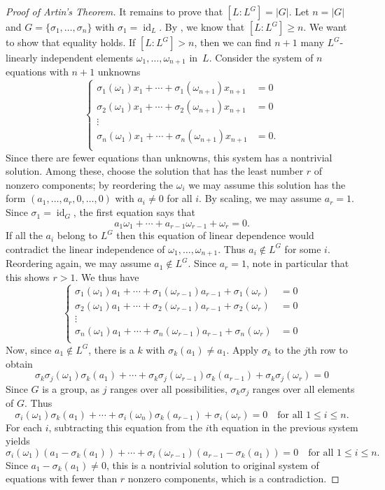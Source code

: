\documentclass[12pt]{amsart}
\theoremstyle{definition}
\numberwithin{equation}{theorem}
\def\id{\operatorname{id}}
\begin{document}
\begin{proof}[Proof of Artin's Theorem]
It remains to prove that $[L: L^G] = |G|$. Let $n = |G|$ and $G=\{\sigma_1, \ldots, \sigma_n\}$ with $\sigma_1 = \id_L$.
By , we know that $[L: L^G] \geqslant n$. We want to show that equality holds.
If $[L: L^G] > n$, then we can find $n+1$ many $L^G$-linearly independent elements $\omega_1, \ldots, \omega_{n+1}$ in~$L$. Consider the system of $n$ equations with $n+1$ unknowns
$$\left\lbrace\begin{array}{cl}
\sigma_1(\omega_1) x_1 + \cdots + \sigma_1(\omega_{n+1}) x_{n+1} & = 0 \\
\sigma_2(\omega_1) x_1 + \cdots + \sigma_2(\omega_{n+1}) x_{n+1} & = 0 \\
\vdots \\
\sigma_n(\omega_1) x_1 + \cdots + \sigma_n(\omega_{n+1}) x_{n+1} & = 0. \\
\end{array}\right.$$
Since there are fewer equations than unknowns, this system has a nontrivial solution. Among these, choose the solution that has the least number $r$ of nonzero components; by reordering the $\omega_i$ we may assume this solution has the form $(a_1, \ldots, a_r, 0, \ldots, 0)$ with $a_i \neq 0$ for all $i$. By scaling, we may assume $a_r = 1$. Since $\sigma_1 = \id_G$, the first equation says that
$$a_1 \omega_1 + \cdots + a_{r-1} \omega_{r-1} + \omega_r = 0.$$
If all the $a_i$ belong to $L^G$ then this equation of linear dependence would contradict the linear independence of $\omega_1, \ldots, \omega_{n+1}$. Thus $a_i \notin L^G$ for some $i$. Reordering again, we may assume $a_1 \notin L^G$.
Since $a_r =1$, note in particular that this shows $r > 1$.
We thus have
$$\left\lbrace\begin{array}{cl}
\sigma_1(\omega_1) a_1 + \cdots + \sigma_1(\omega_{r-1}) a_{r-1} + \sigma_1(\omega_r)  & = 0 \\
\sigma_2(\omega_1) a_1 + \cdots + \sigma_2(\omega_{r-1}) a_{r-1} + \sigma_2(\omega_r)  & = 0 \\
\vdots \\
\sigma_n(\omega_1) a_1 + \cdots + \sigma_n(\omega_{r-1}) a_{r-1} + \sigma_n(\omega_r)  & = 0 \\
\end{array}\right.$$
Now, since $a_1 \notin L^G$, there is a $k$ with $\sigma_k(a_1) \neq a_1$. Apply $\sigma_k$ to the $j$th row to obtain
$$
\sigma_k \sigma_j(\omega_1) \sigma_k(a_1) + \cdots + \sigma_k \sigma_j(\omega_{r-1})\sigma_k(a_{r-1})
+ \sigma_k \sigma_j(\omega_{r})  = 0
$$
Since $G$ is a group, as $j$ ranges over all possibilities, $\sigma_k \sigma_j$ ranges over all
elements of $G$. Thus
$$
\sigma_i(\omega_1) \sigma_k(a_1) + \cdots + \sigma_i(\omega_{n})\sigma_k(a_{r-1})
+ \sigma_i(\omega_{r})  = 0 \quad \textrm{for all } 1 \leqslant i \leqslant n.$$
For each $i$, subtracting this equation from the $i$th equation in the previous system yields
$$\sigma_i(\omega_1) (a_1 -  \sigma_k(a_1)) + \cdots + \sigma_i(\omega_{r-1})(a_{r-1} - \sigma_k(a_1) ) = 0 \quad \textrm{for all } 1 \leqslant i\leqslant n.$$
Since $a_1 - \sigma_k(a_1) \neq 0$, this is a nontrivial solution to original system of equations with fewer than $r$ nonzero components, which is a contradiction. 
\end{proof}
\end{document}
